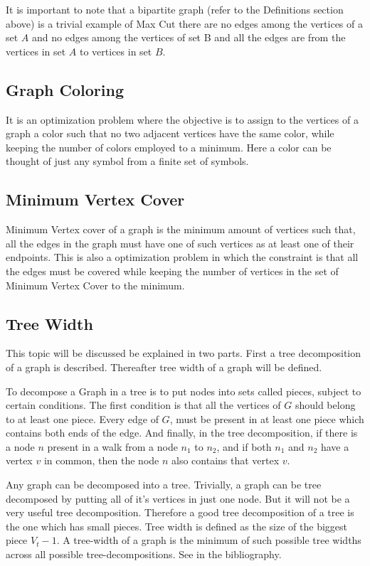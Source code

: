 It is important to note that a bipartite graph (refer to the Definitions
section above) is a trivial example of Max Cut there are no edges among the
vertices of a set $A$ and no edges among the vertices of set B and all the edges
are from the vertices in set $A$ to vertices in set $B$.

\subsection{Graph Coloring}
It is an optimization problem where the objective is to assign to the vertices
of a graph a color such that no two adjacent vertices have the same color,
while keeping the number of colors employed to a minimum. Here a color can be
thought of just any symbol from a finite set of symbols.

\subsection{Minimum Vertex Cover}
Minimum Vertex cover of a graph is the minimum amount of vertices such that,
all the edges in the graph must have one of such vertices as at least one of
their endpoints. This is also a optimization problem in which the constraint is
that all the edges must be covered while keeping the number of vertices in the
set of Minimum Vertex Cover to the minimum.

\subsection{Tree Width}
\label{explanation: treewidth}
This topic will be discussed be explained in two parts. First a tree
decomposition of a graph is described. Thereafter tree width of a
graph will be defined.

To decompose a Graph in a tree is to put nodes into sets called pieces, subject
to certain conditions.  The first condition is that all the vertices of $G$
should belong to at least one piece. Every edge of $G$, must be present in
at least one piece which contains both ends of the edge.  And finally, in the
tree decomposition, if there is a node $n$ present in a walk from a node $n_1$
to $n_2$, and if both $n_1$ and $n_2$ have a vertex $v$ in common, then the node
$n$ also contains that vertex $v$. 

Any graph can be decomposed into a tree. Trivially, a graph can be tree
decomposed by putting all of it's vertices in just one node. But it will not be
a very useful tree decomposition.  Therefore a good tree decomposition of a
tree is the one which has small pieces.  Tree width is defined as the size of
the biggest piece $V_t - 1$. A tree-width of a graph is the minimum of such
possible tree widths across all possible tree-decompositions. See
\cite{KleinbergTardos06} in the bibliography.


